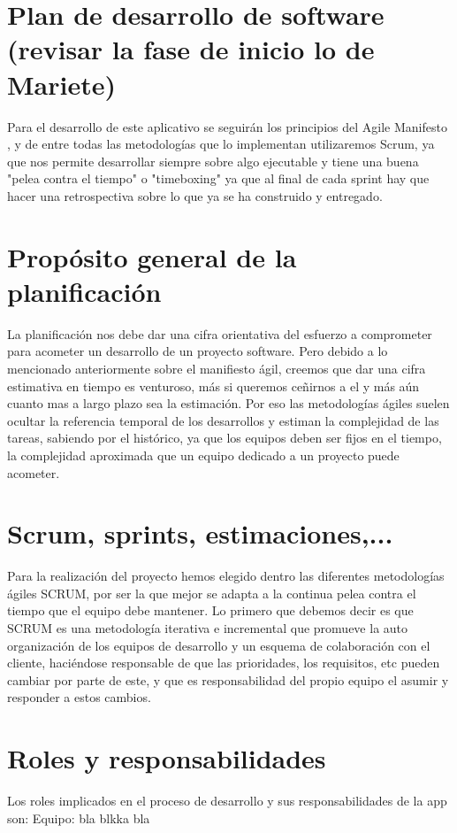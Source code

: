 \documentclass[../pfc.tex]{subfiles}
\begin{document}
	
	\section{Plan de desarrollo de software (revisar la fase de inicio lo de Mariete)}
	
	Para el desarrollo de este aplicativo se seguirán los principios del Agile Manifesto \cite{agile}, y de entre todas las metodologías que lo implementan utilizaremos Scrum, ya que nos permite desarrollar siempre sobre algo ejecutable y tiene una buena "pelea contra el tiempo" o "timeboxing" ya que al final de cada sprint hay que hacer una retrospectiva sobre lo que ya se ha construido y entregado.

	\section{Propósito general de la planificación}
	
	La planificación nos debe dar una cifra orientativa del esfuerzo a comprometer para acometer un desarrollo de un proyecto software. Pero debido a lo mencionado anteriormente sobre el manifiesto ágil, creemos que dar una cifra estimativa en tiempo es venturoso, más si queremos ceñirnos a el y más aún cuanto mas a largo plazo sea la estimación. Por eso las metodologías ágiles suelen ocultar la referencia temporal de los desarrollos y estiman la complejidad de las tareas, sabiendo por el histórico, ya que los equipos deben ser fijos en el tiempo, la complejidad aproximada que un equipo dedicado a un proyecto puede acometer. 
	
	\section{Scrum, sprints, estimaciones,... }
	
	Para la realización del proyecto hemos elegido dentro las diferentes metodologías ágiles SCRUM, por ser la que mejor se adapta a la continua pelea contra el tiempo que el equipo debe mantener. 
	Lo primero que debemos decir es que SCRUM es una metodología iterativa e incremental que promueve la auto organización de los equipos de desarrollo y un esquema de colaboración con el cliente, haciéndose responsable de que las prioridades, los requisitos, etc pueden cambiar por parte de este, y que es responsabilidad del propio equipo el asumir y responder a estos cambios. 
	
	
	\section{Roles y responsabilidades}
	Los roles  implicados en el proceso de desarrollo y sus responsabilidades   de la app son:
	Equipo: bla blkka bla
	
\end{document}
